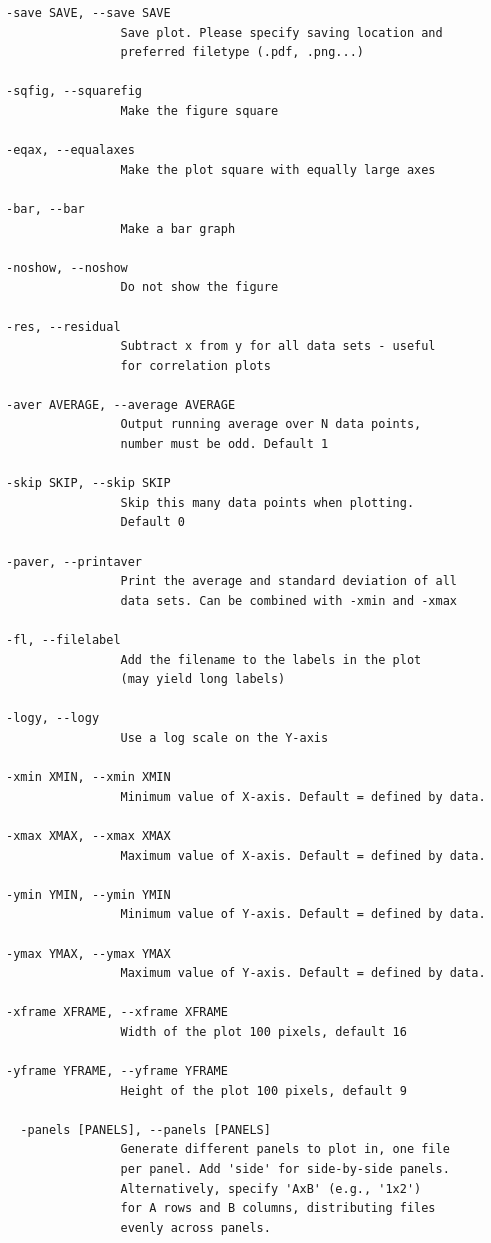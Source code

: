\begin{verbatim}
-save SAVE, --save SAVE
                Save plot. Please specify saving location and 
                preferred filetype (.pdf, .png...)

-sqfig, --squarefig   
                Make the figure square

-eqax, --equalaxes    
                Make the plot square with equally large axes

-bar, --bar           
                Make a bar graph

-noshow, --noshow     
                Do not show the figure

-res, --residual      
                Subtract x from y for all data sets - useful
                for correlation plots

-aver AVERAGE, --average AVERAGE
                Output running average over N data points, 
                number must be odd. Default 1

-skip SKIP, --skip SKIP
                Skip this many data points when plotting. 
                Default 0

-paver, --printaver   
                Print the average and standard deviation of all 
                data sets. Can be combined with -xmin and -xmax

-fl, --filelabel      
                Add the filename to the labels in the plot 
                (may yield long labels)

-logy, --logy         
                Use a log scale on the Y-axis

-xmin XMIN, --xmin XMIN
                Minimum value of X-axis. Default = defined by data.

-xmax XMAX, --xmax XMAX
                Maximum value of X-axis. Default = defined by data.

-ymin YMIN, --ymin YMIN
                Minimum value of Y-axis. Default = defined by data.

-ymax YMAX, --ymax YMAX
                Maximum value of Y-axis. Default = defined by data.

-xframe XFRAME, --xframe XFRAME
                Width of the plot 100 pixels, default 16

-yframe YFRAME, --yframe YFRAME
                Height of the plot 100 pixels, default 9
                
  -panels [PANELS], --panels [PANELS]
                Generate different panels to plot in, one file 
                per panel. Add 'side' for side-by-side panels. 
                Alternatively, specify 'AxB' (e.g., '1x2') 
                for A rows and B columns, distributing files
                evenly across panels.
                

\end{verbatim}
